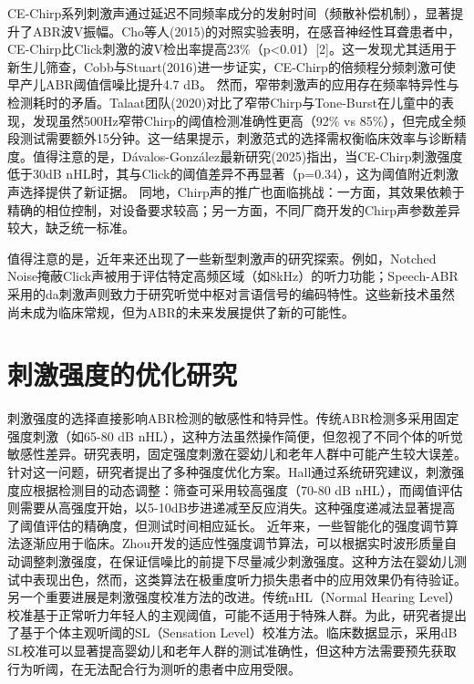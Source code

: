 CE-Chirp系列刺激声通过延迟不同频率成分的发射时间（频散补偿机制），显著提升了ABR波V振幅。Cho等人(2015)\cite{cho2015auditory}的对照实验表明，在感音神经性耳聋患者中，CE-Chirp比Click刺激的波V检出率提高23\%（p<0.01）[2]。这一发现尤其适用于新生儿筛查，Cobb与Stuart(2016)\cite{cobb2016neonate}进一步证实，CE-Chirp的倍频程分频刺激可使早产儿ABR阈值信噪比提升4.7 dB。
然而，窄带刺激声的应用存在频率特异性与检测耗时的矛盾。Talaat团队(2020)\cite{talaat2020hearing}对比了窄带Chirp与Tone-Burst在儿童中的表现，发现虽然500Hz窄带Chirp的阈值检测准确性更高（92\% vs 85\%），但完成全频段测试需要额外15分钟。这一结果提示，刺激范式的选择需权衡临床效率与诊断精度。值得注意的是，Dávalos-González最新研究(2025)\cite{davalos2025auditory}指出，当CE-Chirp刺激强度低于30dB nHL时，其与Click的阈值差异不再显著（p=0.34），这为阈值附近刺激声选择提供了新证据。
同地，Chirp声的推广也面临挑战：一方面，其效果依赖于精确的相位控制，对设备要求较高；另一方面，不同厂商开发的Chirp声参数差异较大，缺乏统一标准。


值得注意的是，近年来还出现了一些新型刺激声的研究探索。例如，Notched Noise掩蔽Click声被用于评估特定高频区域（如8kHz）的听力功能\cite{nakamura2021notched,li2020notched}；Speech-ABR采用的da刺激声则致力于研究听觉中枢对言语信号的编码特性。这些新技术虽然尚未成为临床常规，但为ABR的未来发展提供了新的可能性。

\section{刺激强度的优化研究}
刺激强度的选择直接影响ABR检测的敏感性和特异性。传统ABR检测多采用固定强度刺激（如65-80 dB nHL），这种方法虽然操作简便，但忽视了不同个体的听觉敏感性差异。研究表明，固定强度刺激在婴幼儿和老年人群中可能产生较大误差\cite{johnson2010variability}。
针对这一问题，研究者提出了多种强度优化方案。Hall\cite{hall2007new}通过系统研究建议，刺激强度应根据检测目的动态调整：筛查可采用较高强度（70-80 dB nHL），而阈值评估则需要从高强度开始，以5-10dB步进递减至反应消失。这种强度递减法显著提高了阈值评估的精确度，但测试时间相应延长。
近年来，一些智能化的强度调节算法逐渐应用于临床。Zhou\cite{zhou2010adaptive,zhou2012adaptive}开发的适应性强度调节算法，可以根据实时波形质量自动调整刺激强度，在保证信噪比的前提下尽量减少刺激强度。这种方法在婴幼儿测试中表现出色，然而，这类算法在极重度听力损失患者中的应用效果仍有待验证。
另一个重要进展是刺激强度校准方法的改进。传统nHL（Normal Hearing Level）校准基于正常听力年轻人的主观阈值，可能不适用于特殊人群。为此，研究者提出了基于个体主观听阈的SL（Sensation Level）校准方法\cite{leon1999calibration,rance2002method}。临床数据显示，采用dB SL校准可以显著提高婴幼儿和老年人群的测试准确性，但这种方法需要预先获取行为听阈，在无法配合行为测听的患者中应用受限。

